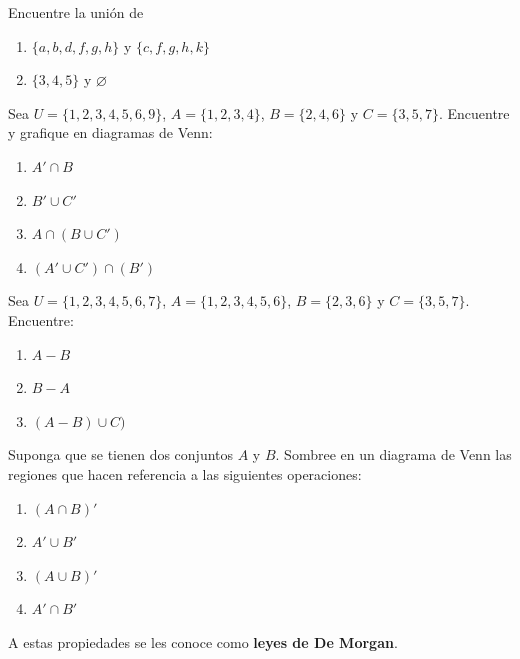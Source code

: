\documentclass[12pt]{article}
\begin{document}
\begin{problema}
    Encuentre la unión de
    \renewcommand{\labelenumi}{\alph{enumi})}
    \begin{enumerate}
        \item $\{a,b,d,f,g,h\}$ y $\{c,f,g,h,k\}$
        \item $\{3,4,5\}$ y $\varnothing$
    \end{enumerate}
\end{problema}

\newpage

\begin{problema}
    Sea $U=\{1,2,3,4,5,6,9\}$, $A=\{1,2,3,4\}$, $B=\{2,4,6\}$ y $C=\{3,5,7\}$. Encuentre y grafique en diagramas de Venn:
    \renewcommand{\labelenumi}{\alph{enumi})}
    \begin{enumerate}
        \item $A' \cap B$
        \item $B' \cup C'$
        \item $A \cap (B \cup C')$
        \item $(A' \cup C') \cap (B')$
    \end{enumerate}
\end{problema}

\begin{problema}
    Sea $U=\{1,2,3,4,5,6,7\}$, $A=\{1,2,3,4,5,6\}$, $B=\{2,3,6\}$ y $C=\{3,5,7\}$. Encuentre:
    \renewcommand{\labelenumi}{\alph{enumi})}
    \begin{enumerate}
        \item $A-B$
        \item $B-A$
        \item $(A-B) \cup C)$
    \end{enumerate}
\end{problema}

\begin{problema}
    Suponga que se tienen dos conjuntos $A$ y $B$. Sombree en un diagrama de Venn las regiones que hacen referencia a las siguientes operaciones:
    \renewcommand{\labelenumi}{\alph{enumi})}
    \begin{enumerate}
        \item $(A \cap B)'$
        \item $A' \cup B'$
        \item $(A \cup B)'$
        \item $A' \cap B'$
    \end{enumerate}
    A estas propiedades se les conoce como \textbf{leyes de De Morgan}.
\end{problema}
\end{document}
